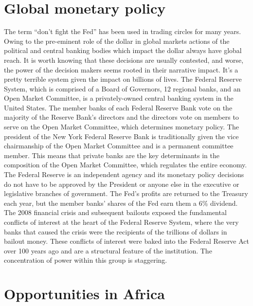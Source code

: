 \section{Global monetary policy}
The term ``don't fight the Fed'' has been used in trading circles for many years. Owing to the pre-eminent role of the dollar in global markets actions of the political and central banking bodies which impact the dollar always have global reach. It is worth knowing that these decisions are usually contested, and worse, the power of the decision makers seems rooted in their narrative impact. It's a pretty terrible system given the impact on billions of lives. The Federal Reserve System, which is comprised of a Board of Governors, 12 regional banks, and an Open Market Committee, is a privately-owned central banking system in the United States. The member banks of each Federal Reserve Bank vote on the majority of the Reserve Bank's directors and the directors vote on members to serve on the Open Market Committee, which determines monetary policy. The president of the New York Federal Reserve Bank is traditionally given the vice chairmanship of the Open Market Committee and is a permanent committee member. This means that private banks are the key determinants in the composition of the Open Market Committee, which regulates the entire economy. The Federal Reserve is an independent agency and its monetary policy decisions do not have to be approved by the President or anyone else in the executive or legislative branches of government. The Fed's profits are returned to the Treasury each year, but the member banks' shares of the Fed earn them a 6\% dividend. The 2008 financial crisis and subsequent bailouts exposed the fundamental conflicts of interest at the heart of the Federal Reserve System, where the very banks that caused the crisis were the recipients of the trillions of dollars in bailout money. These conflicts of interest were baked into the Federal Reserve Act over 100 years ago and are a structural feature of the institution. The concentration of power within this group is staggering. 
\section{Opportunities in Africa}

